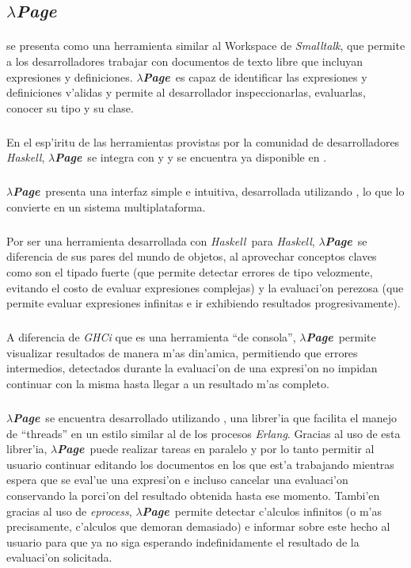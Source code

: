 \documentclass[a4paper]{article}
\newcommand{\haskell}{\textsl{Haskell}}
\newcommand{\hpage}{\textbf{\textsl{$\lambda$Page}}}
\begin{document}
\subsection{\hpage}
\paragraph{} \htmladdnormallinkfoot{\hpage}{http://haskell.hpage.com} se presenta como una herramienta  similar al Workspace de \textit{Smalltalk}, que permite a los desarrolladores trabajar con documentos de texto libre que incluyan expresiones y definiciones.  \hpage\ es capaz de identificar las expresiones y definiciones v'alidas y permite al desarrollador inspeccionarlas, evaluarlas, conocer su tipo y su clase.
\subparagraph{}En el esp'iritu de las herramientas provistas por la comunidad de desarrolladores \haskell, \hpage\ se integra con  y  y se encuentra ya disponible en .
\subparagraph{}\hpage\ presenta una interfaz simple e intuitiva, desarrollada utilizando , lo que lo convierte en un sistema multiplataforma.
\subparagraph{}Por ser una herramienta desarrollada con \haskell\ para \haskell, \hpage\ se diferencia de sus pares del mundo de objetos, al aprovechar conceptos claves como son el tipado fuerte (que permite detectar errores de tipo velozmente, evitando el costo de evaluar expresiones complejas) y la evaluaci'on perezosa (que permite evaluar expresiones infinitas e ir exhibiendo resultados progresivamente).
\subparagraph{}A diferencia de \textsl{GHCi} que es una herramienta ``de consola'', \hpage\ permite visualizar resultados de manera m'as din'amica, permitiendo que errores intermedios, detectados durante la evaluaci'on de una expresi'on no impidan continuar con la misma hasta llegar a un resultado m'as completo.
\subparagraph{}\hpage\ se encuentra desarrollado utilizando , una librer'ia que facilita el manejo de ``threads'' en un estilo similar al de los procesos \textsl{Erlang}.  Gracias al uso de esta librer'ia, \hpage\ puede realizar tareas en paralelo y por lo tanto permitir al usuario continuar editando los documentos en los que est'a trabajando mientras espera que se eval'ue una expresi'on e incluso cancelar una evaluaci'on conservando la porci'on del resultado obtenida hasta ese momento.  Tambi'en gracias al uso de \textsl{eprocess}, \hpage\ permite detectar c'alculos infinitos (o m'as precisamente, c'alculos que demoran demasiado) e informar sobre este hecho al usuario para que ya no siga esperando indefinidamente el resultado de la evaluaci'on solicitada.
\newpage
\end{document}
